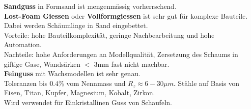 \textbf{Sandguss} in Formsand ist mengenmässig vorherrschend.\\

\textbf{Lost-Foam Giessen} oder \textbf{Vollformgiessen} ist sehr gut für komplexe Bauteile.\\
Dabei werden Schäumlinge in Sand eingebettet. \\
Vorteile: hohe Bauteilkomplexität, geringe Nachbearbeitung und hohe Automation.\\
Nachteile: hohe Anforderungen an Modellqualität, Zersetzung des Schaums in giftige Gase, Wandsärken $<$ 3mm fast nicht machbar.\\

\textbf{Feinguss} mit Wachsmodellen ist sehr genau.\\
Toleranzen bis 0.4\% vom Nennmass und $R_z \approx 6-30 \mu m$. Stähle auf Basis von Eisen, Titan, Kupfer, Magnesium, Kobalt, Zirkon.\\
Wird verwendet für Einkristallinen Guss von Schaufeln.